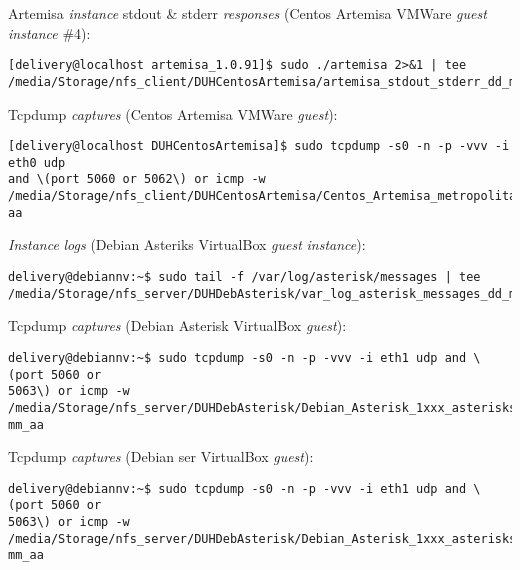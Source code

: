 \documentclass[a4paper,12pt]{report}
\newenvironment{myscriptlisting}
{\begin{list}{}{\setlength{\leftmargin}{1em}}\item\scriptsize\bfseries}
{\end{list}}
\begin{document}
Artemisa \emph{instance} \ac{stdout} \& \ac{stderr} \emph{responses} (Centos Artemisa
VMWare \emph{guest} \emph{instance} \#4):
\begin{myscriptlisting}   
  \begin{verbatim}
[delivery@localhost artemisa_1.0.91]$ sudo ./artemisa 2>&1 | tee
/media/Storage/nfs_client/DUHCentosArtemisa/artemisa_stdout_stderr_dd_mm_aa
  \end{verbatim}
\end{myscriptlisting}

Tcpdump \emph{captures} (Centos Artemisa VMWare \emph{guest}):
\begin{myscriptlisting}   
  \begin{verbatim}
[delivery@localhost DUHCentosArtemisa]$ sudo tcpdump -s0 -n -p -vvv -i eth0 udp
and \(port 5060 or 5062\) or icmp -w
/media/Storage/nfs_client/DUHCentosArtemisa/Centos_Artemisa_metropolitan1_dd_mm_
aa
  \end{verbatim}
\end{myscriptlisting}

\emph{Instance} \emph{logs} (Debian Asteriks VirtualBox \emph{guest} \emph{instance}):
\begin{myscriptlisting}   
  \begin{verbatim}
delivery@debiannv:~$ sudo tail -f /var/log/asterisk/messages | tee
/media/Storage/nfs_server/DUHDebAsterisk/var_log_asterisk_messages_dd_mm_aa
  \end{verbatim}
\end{myscriptlisting}

Tcpdump \emph{captures} (Debian Asterisk VirtualBox \emph{guest}):
\begin{myscriptlisting}   
  \begin{verbatim}
delivery@debiannv:~$ sudo tcpdump -s0 -n -p -vvv -i eth1 udp and \(port 5060 or
5063\) or icmp -w
/media/Storage/nfs_server/DUHDebAsterisk/Debian_Asterisk_1xxx_asteriskserver_dd_
mm_aa
  \end{verbatim}
\end{myscriptlisting}


Tcpdump \emph{captures} (Debian \ac{ser} VirtualBox \emph{guest}):
\begin{myscriptlisting}   
  \begin{verbatim}
delivery@debiannv:~$ sudo tcpdump -s0 -n -p -vvv -i eth1 udp and \(port 5060 or
5063\) or icmp -w
/media/Storage/nfs_server/DUHDebAsterisk/Debian_Asterisk_1xxx_asteriskserver_dd_
mm_aa
  \end{verbatim}
\end{myscriptlisting}
\end{document}
